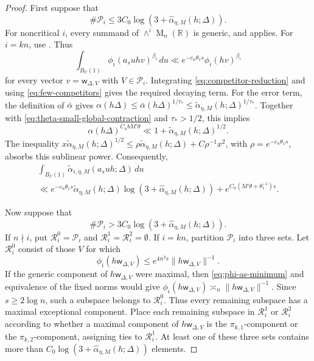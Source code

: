 \documentclass[10pt,a4paper]{amsart}
\newcommand{\M}{\op{M}}
\newcommand{\op}{\operatorname}
\begin{document}
\begin{proof}
 First suppose that
\begin{equation}\label{eq:few-competitors}
\#\mathcal P_i
\le 3C_0\log(3+\widehat{\alpha}_{\eta,M}(h;\Delta)).
\end{equation}
For noncritical $i$, every summand of $\wedge^i\M_n(\mathbb R)$ is
generic, and 
applies. For $i=kn$, use
. Thus
$$
\int_{B_{U}(1)}
\phi_i(a_suhv)^{\beta_i}\,du
\ll e^{-c_n\theta_1 s}\phi_i(hv)^{\beta_i}
$$
for every vector $v=\mathsf{w}_{\Delta,V}$ with $V\in \mathcal P_i$. Integrating \eqref{eq:competitor-reduction} and using
\eqref{eq:few-competitors} gives the required decaying term. For the error
term, the definition of $\bar\alpha$ gives $\alpha(h\Delta)
\le \bar\alpha(h\Delta)^{1/\tau_*}
\le \widetilde\alpha_{\eta,M}(h;\Delta)^{1/\tau_*}$.
Together with \eqref{eq:theta-small-global-contraction} and
$\tau_*>1/2$, this implies
$$
\alpha(h\Delta)^{C_nbM'\theta}
\ll 1+\widetilde\alpha_{\eta,M}(h;\Delta)^{1/2}.
$$
The inequality
$x\widetilde\alpha_{\eta,M}(h;\Delta)^{1/2}
\le \rho\widetilde\alpha_{\eta,M}(h;\Delta)+C\rho^{-1}x^2$, with
$\rho=e^{-c_n\theta_1 s}$, absorbs this sublinear power. Consequently,
\begin{multline}\label{eq:few-competitors-bound}
\int_{B_{U}(1)}
\widetilde\alpha_{i,\eta,M}(a_suh;\Delta)\,du
\\ \ll
 e^{-c_n\theta_1 s}\widetilde\alpha_{\eta,M}(h;\Delta)
 \log(3+\widehat{\alpha}_{\eta,M}(h;\Delta))
+e^{C_n(M'\theta+\theta_1^{-1})s}.
\end{multline}

 Now suppose that
\begin{equation}\label{large}
\#\mathcal P_i
> 3C_0\log(3+\widehat{\alpha}_{\eta,M}(h;\Delta)).
\end{equation} If $n\nmid i$, put
$\mathcal R_i^0=\mathcal P_i$ and
$\mathcal R_i^1=\mathcal R_i^2=\emptyset$. If $i=kn$, partition
$\mathcal P_i$ into three sets. Let $\mathcal R_i^0$ consist of
those $V$ for which
$$
\phi_i(h\mathsf w_{\Delta,V})
\le e^{4n^3s}\|h\mathsf w_{\Delta,V}\|^{-1}.
$$
If the generic component of $h\mathsf w_{\Delta,V}$ were maximal, then
\eqref{eq:phi-as-minimum} and equivalence of the fixed norms would give
$\phi_i(h\mathsf w_{\Delta,V})\asymp_n
\|h\mathsf w_{\Delta,V}\|^{-1}$. Since $s\ge2\log n$, such a subspace
belongs to $\mathcal R_i^0$. Thus every remaining subspace has a maximal
exceptional component.
Place each remaining subspace in $\mathcal R_i^1$ or
$\mathcal R_i^2$ according to whether a maximal component of
$h\mathsf w_{\Delta,V}$ is the $\pi_{k,1}$-component or the
$\pi_{k,2}$-component, assigning ties to $\mathcal R_i^1$. At least one of
these three sets contains more than
$C_0\log(3+\widehat{\alpha}_{\eta,M}(h;\Delta))$ elements.



\end{proof}
\end{document}
